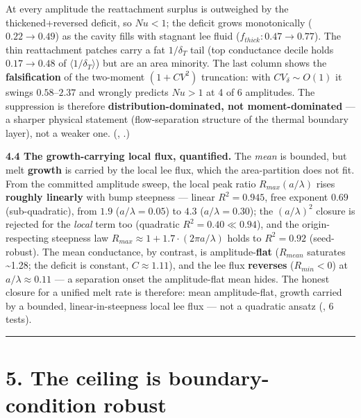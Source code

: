 \documentclass[11pt]{article}
\begin{document}
At every amplitude the reattachment surplus is outweighed by the thickened+reversed deficit, so $Nu<1$; the deficit grows monotonically ($0.22\to 0.49$) as the cavity fills with stagnant lee fluid ($f_{thick}: 0.47\to 0.77$). The thin reattachment patches carry a fat $1/\delta _{T}$ tail (top conductance decile holds $0.17\to 0.48$ of $\langle 1/\delta _{T}\rangle $) but are an area minority. The last column shows the \textbf{falsification} of the two-moment $(1+CV^{2})$ truncation: with $CV_\delta \sim O(1)$ it swings $0.58–2.37$ and wrongly predicts $Nu>1$ at 4 of 6 amplitudes. The suppression is therefore \textbf{distribution-dominated, not moment-dominated} — a sharper physical statement (flow-separation structure of the thermal boundary layer), not a weaker one. (, .)


\textbf{4.4 The growth-carrying local flux, quantified.} The \emph{mean} is bounded, but melt \textbf{growth} is carried by the local lee flux, which the area-partition does not fit. From the committed amplitude sweep, the local peak ratio $R_{max}(a/\lambda )$ rises \textbf{roughly linearly} with bump steepness — linear $R^{2}=0.945$, free exponent $0.69$ (sub-quadratic), from $1.9$ ($a/\lambda =0.05$) to $4.3$ ($a/\lambda =0.30$); the $(a/\lambda )^{2}$ closure is rejected for the \emph{local} term too (quadratic $R^{2}=0.40\ll 0.94$), and the origin-respecting steepness law $R_{max}\approx 1+1.7\cdot (2\pi  a/\lambda )$ holds to $R^{2}=0.92$ (seed-robust). The mean conductance, by contrast, is amplitude-\textbf{flat} ($R_{mean}$ saturates \textasciitilde{}1.28; the  deficit is constant, $C\approx 1.11$), and the lee flux \textbf{reverses} ($R_{min}<0$) at $a/\lambda \approx 0.11$ — a separation onset the amplitude-flat mean hides. The honest closure for a unified melt rate is therefore: mean amplitude-flat, growth carried by a bounded, linear-in-steepness local lee flux — not a quadratic ansatz (, 6 tests).


\medskip\hrule\medskip


\section*{5. The ceiling is boundary-condition robust}
\end{document}
